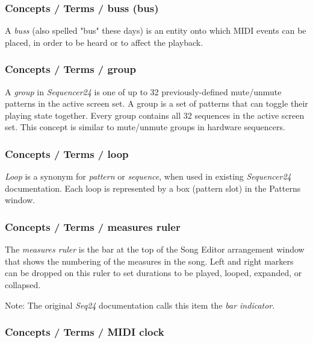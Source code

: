 \subsubsection{Concepts / Terms / buss (bus)}
\label{subsubsec:concepts_terms_buss}

   A \textsl{buss} (also spelled "bus" these days) is an entity onto which
   MIDI events can be placed, in order to be heard or to affect the
   playback.

\subsubsection{Concepts / Terms / group}
\label{subsubsec:concepts_terms_group}

   A \textsl{group} in \textsl{Sequencer24} is one of up to 32 previously-defined
   mute/unmute patterns in the active screen set.
   A group is a set of patterns that can toggle their playing state
   together.  Every group contains all 32 sequences in the active screen
   set.  This concept is similar to mute/unmute groups in hardware
   sequencers.

\subsubsection{Concepts / Terms / loop}
\label{subsubsec:concepts_terms_loop}

   \textsl{Loop}
   is a synonym for \textsl{pattern} or \textsl{sequence}, when used
   in existing \textsl{Sequencer24} documentation.
   Each loop is represented by a box (pattern slot) in the Patterns window.

\subsubsection{Concepts / Terms / measures ruler}
\label{subsubsec:concepts_terms_measures_ruler}

   The \textsl{measures ruler} is the bar at the top of the Song Editor
   arrangement window that shows the numbering of the measures in the song.
   Left and right markers can be dropped on this ruler to set durations to
   be played, looped, expanded, or collapsed.

   Note:
   The original \textsl{Seq24} documentation calls this item the
   \textsl{bar indicator}.

\subsubsection{Concepts / Terms / MIDI clock}
\label{subsubsec:concepts_terms_midi_clock}

